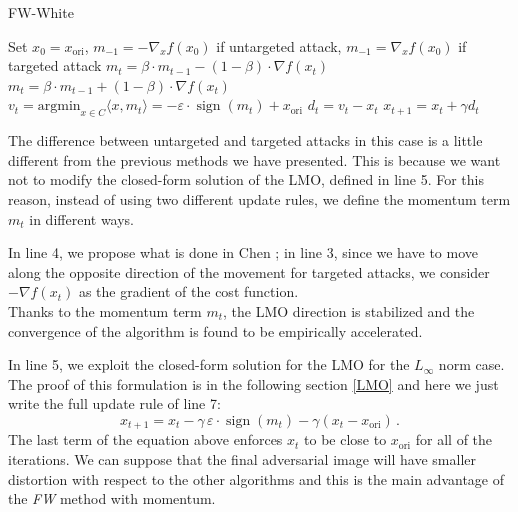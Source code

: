 \documentclass[10pt,twocolumn,letterpaper, english]{article}
\newcommand{\sign}{\mathop{\mathrm{sign}}}
\theoremstyle{definition}
\theoremstyle{plain}
\theoremstyle{plain}
\theoremstyle{plain}
\theoremstyle{plain}
\theoremstyle{remark}
\theoremstyle{remark}
\theoremstyle{definition}
\theoremstyle{definition}
\theoremstyle{definition}
\theoremstyle{definition}
\renewcommand{\epsilon}{\varepsilon}
\begin{document}
\begin{algorithm}
\caption{FW-White}\label{FW}
\begin{algorithmic}[1]

\State Set $x_0 = x_{\text{ori}}$, $m_{-1} = - \nabla_x f(x_0)$ if untargeted attack, $m_{-1} = \nabla_x f(x_0)$ if targeted attack
    \State $m_t = \beta \cdot m_{t-1} - (1-\beta) \cdot \nabla f(x_t) $ 
    \State $m_t = \beta \cdot m_{t-1} + (1-\beta) \cdot \nabla f(x_t) $ 
    \State $v_t = \text{argmin}_{x \in C} \langle x, m_t \rangle = - \epsilon \cdot \sign (m_t) + x_{\text{ori}} $
    \State $d_t = v_t - x_t $
    \State $x_{t+1} = x_t + \gamma d_t $
    
\EndFor
\end{algorithmic}
\end{algorithm}

The difference between untargeted and targeted attacks in this case is a little different from the previous methods we have presented. 
This is because we want not to modify the closed-form solution of the LMO, defined in line 5. 
For this reason, instead of using two different update rules, we define the momentum term $m_t$ in different ways. 

In line 4, we propose what is done in Chen \cite{frank}; in line 3, since we have to move along the opposite direction of the movement for targeted attacks, we consider $- \nabla f(x_t)$ as the gradient of the cost function. \\

Thanks to the momentum term $m_t$, the LMO direction is stabilized and the convergence of the algorithm is found to be empirically accelerated. 

In line 5, we exploit the closed-form solution for the LMO for the $L_\infty$ norm case. 
The proof of this formulation is in the following section \ref{LMO} and here we just write the full update rule of line 7:
\begin{equation*}
    x_{t+1} = x_t - \gamma \, \epsilon \cdot \sign(m_t) - \gamma (x_t - x_{\text{ori}}) \,.
\end{equation*}
The last term of the equation above enforces $x_t$ to be close to $x_{\text{ori}}$ for all of the iterations. 
We can suppose that the final adversarial image will have smaller distortion with respect to the other algorithms and this is the main advantage of the \textit{FW} method with momentum. 
\end{document}
